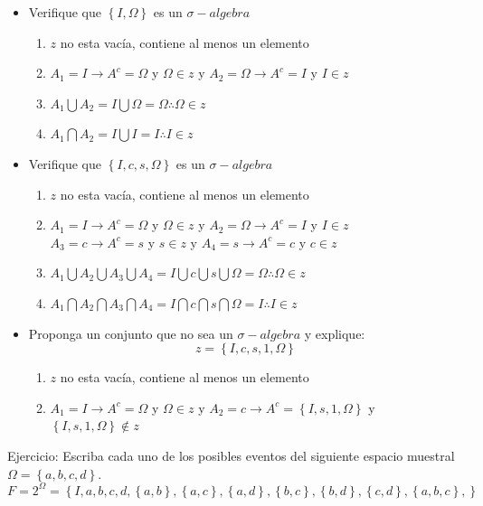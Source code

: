 \documentclass[11pt,fleqn]{book} %
\numberwithin{equation}{section} %
\numberwithin{figure}{section} %
\numberwithin{table}{section} %
\begin{document}
\begin{itemize}
    \item Verifique que $\left\{ I, \Omega \right\}$ es un $\sigma-algebra$
    \begin{enumerate}
    \item $z$ no esta vacía, contiene al menos un elemento
    \item $A_{1} = I \rightarrow A^{c} = \Omega$ y  $\Omega \in z$ y 
    $A_{2} = \Omega \rightarrow A^{c} = I$ y  $I \in z$
    \item $A_{1} \bigcup A_{2} = I \bigcup \Omega = \Omega \therefore \Omega \in z$
    \item $A_{1} \bigcap A_{2} = I \bigcup I = I \therefore I \in z$
\end{enumerate}
    \item Verifique que $\left\{ I,c,s, \Omega \right\}$ es un $\sigma-algebra$
    \begin{enumerate}
    \item $z$ no esta vacía, contiene al menos un elemento
    \item $A_{1} = I \rightarrow A^{c} = \Omega$ y  $\Omega \in z$ y 
    $A_{2} = \Omega \rightarrow A^{c} = I$ y  $I \in z$\\
    $A_{3} = c \rightarrow A^{c} = s$ y  $s \in z$ y 
    $A_{4} = s \rightarrow A^{c} = c$ y  $c \in z$
    \item $A_{1} \bigcup A_{2} \bigcup A_{3} \bigcup A_{4} = I \bigcup c \bigcup s \bigcup \Omega = \Omega \therefore \Omega \in z$
    \item $A_{1} \bigcap A_{2} \bigcap A_{3} \bigcap A_{4} = I \bigcap c \bigcap s \bigcap \Omega = I \therefore I \in z$
\end{enumerate}
    \item Proponga un conjunto que no sea un $\sigma-algebra$ y explique: $$ z =  \left\{ I,c,s,1, \Omega \right\} $$
    \begin{enumerate}
    \item $z$ no esta vacía, contiene al menos un elemento
    \item $A_{1} = I \rightarrow A^{c} = \Omega$ y  $\Omega \in z$ y 
    $A_{2} = c \rightarrow A^{c} = \left\{ I,s,1, \Omega \right\}$ y  $\left\{ I,s,1, \Omega \right\} \notin z$
\end{enumerate}
\end{itemize}
Ejercicio: Escriba cada uno de los posibles eventos del siguiente espacio muestral $\Omega = \left\{ a,b,c,d \right\} $.
$$ F = 2^{\Omega} = \left\{ I,a,b,c,d, \left\{ a,b \right\}, \left\{ a,c \right\}, \left\{ a,d \right\}, \left\{ b,c \right\}, \left\{ b,d \right\}, \left\{ c,d \right\}, \left\{ a,b,c \right\}, \right\}  $$ 
\end{document}
